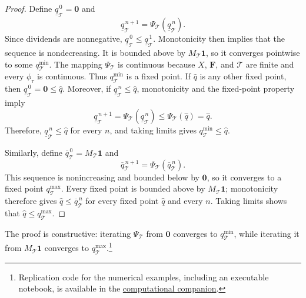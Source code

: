 \documentclass[11pt]{article}
\theoremstyle{plain}
\begin{document}
\begin{proof}
Define $\underline q^{\,0}_{\mathcal{T}}=\mathbf{0}$ and
\[
\underline q^{\,n+1}_{\mathcal{T}}
=
\Psi_{\mathcal{T}}\left(\underline q^{\,n}_{\mathcal{T}}\right).
\]
Since dividends are nonnegative, $\underline q^{\,0}_{\mathcal{T}}\leq\underline q^{\,1}_{\mathcal{T}}$. Monotonicity then implies that the sequence is nondecreasing. It is bounded above by $M_{\mathcal{T}}\mathbf{1}$, so it converges pointwise to some $q^{\min}_{\mathcal{T}}$. The mapping $\Psi_{\mathcal{T}}$ is continuous because $X$, $\mathbf{F}$, and $\mathcal{T}$ are finite and every $\phi_\tau$ is continuous. Thus $q^{\min}_{\mathcal{T}}$ is a fixed point. If $\widehat q$ is any other fixed point, then $\underline q^{\,0}_{\mathcal{T}}=\mathbf{0}\leq\widehat q$. Moreover, if $\underline q^{\,n}_{\mathcal{T}}\leq\widehat q$, monotonicity and the fixed-point property imply
\[
\underline q^{\,n+1}_{\mathcal{T}}
=\Psi_{\mathcal{T}}\left(\underline q^{\,n}_{\mathcal{T}}\right)
\leq\Psi_{\mathcal{T}}(\widehat q)
=\widehat q.
\]
Therefore, $\underline q^{\,n}_{\mathcal{T}}\leq\widehat q$ for every $n$, and taking limits gives $q^{\min}_{\mathcal{T}}\leq\widehat q$.

Similarly, define $\overline q^{\,0}_{\mathcal{T}}=M_{\mathcal{T}}\mathbf{1}$ and
\[
\overline q^{\,n+1}_{\mathcal{T}}
=
\Psi_{\mathcal{T}}\left(\overline q^{\,n}_{\mathcal{T}}\right).
\]
This sequence is nonincreasing and bounded below by $\mathbf{0}$, so it converges to a fixed point $q^{\max}_{\mathcal{T}}$. Every fixed point is bounded above by $M_{\mathcal{T}}\mathbf{1}$; monotonicity therefore gives $\widehat q\leq\overline q^{\,n}_{\mathcal{T}}$ for every fixed point $\widehat q$ and every $n$. Taking limits shows that $\widehat q\leq q^{\max}_{\mathcal{T}}$.
\end{proof}

The proof is constructive: iterating $\Psi_{\mathcal{T}}$ from $\mathbf{0}$ converges to $q^{\min}_{\mathcal{T}}$, while iterating it from $M_{\mathcal{T}}\mathbf{1}$ converges to $q^{\max}_{\mathcal{T}}$.\footnote{Replication code for the numerical examples, including an executable notebook, is available in the \href{https://github.com/oliverpardo1979/Asset-value-and-securitization-under-heterogeneous-beliefs-anew/tree/jme-r2-companion-2026-10-05/computational_companion}{computational companion}.}
\end{document}
